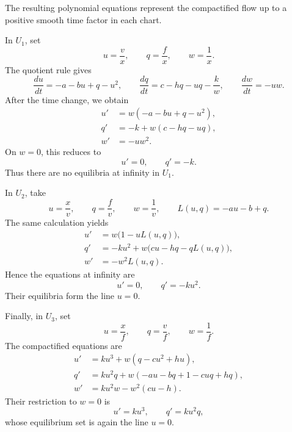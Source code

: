 \documentclass[11pt,reqno]{amsart}
\theoremstyle{plain}
\theoremstyle{definition}
\theoremstyle{remark}
\begin{document}
The resulting polynomial equations represent the compactified
flow up to a positive smooth time factor in each chart.

In $U_1$, set
\[
u=\frac vx,\qquad q=\frac fx,\qquad w=\frac1x.
\]
The quotient rule gives
\[
\frac{du}{dt}=-a-bu+q-u^2,\qquad
\frac{dq}{dt}=c-hq-uq-\frac{k}{w},\qquad
\frac{dw}{dt}=-uw.
\]
After the time change, we obtain
\begin{equation}
\label{eq:chart-U1}
\begin{aligned}
u'&=w(-a-bu+q-u^2),\\
q'&=-k+w(c-hq-uq),\\
w'&=-uw^2.
\end{aligned}
\end{equation}
On $w=0$, this reduces to
\begin{equation}
\label{eq:boundary-U1}
u'=0,\qquad q'=-k.
\end{equation}
Thus there are no equilibria at infinity in $U_1$.

In $U_2$, take
\[
u=\frac xv,\qquad q=\frac fv,\qquad w=\frac1v,
\qquad L(u,q)=-au-b+q.
\]
The same calculation yields
\begin{equation}
\label{eq:chart-U2}
\begin{aligned}
u'&=w\bigl(1-uL(u,q)\bigr),\\
q'&=-ku^2+w\bigl(cu-hq-qL(u,q)\bigr),\\
w'&=-w^2L(u,q).
\end{aligned}
\end{equation}
Hence the equations at infinity are
\begin{equation}
\label{eq:boundary-U2}
u'=0,\qquad q'=-ku^2.
\end{equation}
Their equilibria form the line $u=0$.

Finally, in $U_3$, set
\[
u=\frac xf,\qquad q=\frac vf,\qquad w=\frac1f.
\]
The compactified equations are
\begin{equation}
\label{eq:chart-U3}
\begin{aligned}
u'&=ku^3+w(q-cu^2+hu),\\
q'&=ku^2q+w(-au-bq+1-cuq+hq),\\
w'&=ku^2w-w^2(cu-h).
\end{aligned}
\end{equation}
Their restriction to $w=0$ is
\begin{equation}
\label{eq:boundary-U3}
u'=ku^3,\qquad q'=ku^2q,
\end{equation}
whose equilibrium set is again the line $u=0$.
\end{document}
